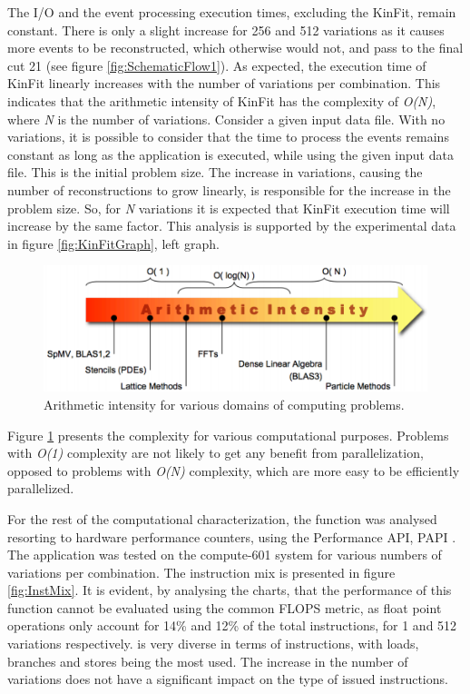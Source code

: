 The I/O and the event processing execution times, excluding the KinFit, remain constant. There is only a slight increase for 256 and 512 variations as it causes more events to be reconstructed, which otherwise would not, and pass to the final cut 21 (see figure \ref{fig:SchematicFlow1}). As expected, the execution time of KinFit linearly increases with the number of variations per combination. This indicates that the arithmetic intensity of KinFit has the complexity of \textit{O(N)}, where \textit{N} is the number of variations. Consider a given input data file. With no variations, it is possible to consider that the time to process the events remains constant as long as the application is executed, while using the given input data file. This is the initial problem size. The increase in variations, causing the number of reconstructions to grow linearly, is responsible for the increase in the problem size. So, for \textit{N} variations it is expected that KinFit execution time will increase by the same factor. This analysis is supported by the experimental data in figure \ref{fig:KinFitGraph}, left graph.

\begin{figure}[!htp]
	\begin{center}
		\includegraphics[scale=0.6]{../../common/img/arithmetic_intensity.png}  
		\caption{Arithmetic intensity for various domains of computing problems.}
		\label{fig:ArithmeticIntensity}
	\end{center}
\end{figure}

Figure \ref{fig:ArithmeticIntensity} presents the complexity for various computational purposes. Problems with \textit{O(1)} complexity are not likely to get any benefit from parallelization, opposed to problems with \textit{O(N)} complexity, which are more easy to be efficiently parallelized.

For the rest of the computational characterization, the \ttDilepKinFit function was analysed resorting to hardware performance counters, using the Performance API, PAPI \cite{PAPI}. The application was tested on the compute-601 system for various numbers of variations per combination. The instruction mix is presented in figure \ref{fig:InstMix}. It is evident, by analysing the charts, that the performance of this function cannot be evaluated using the common FLOPS metric, as float point operations only account for 14\% and 12\% of the total instructions, for 1 and 512 variations respectively. \ttDilepKinFit is very diverse in terms of instructions, with loads, branches and stores being the most used. The increase in the number of variations does not have a significant impact on the type of issued instructions.

